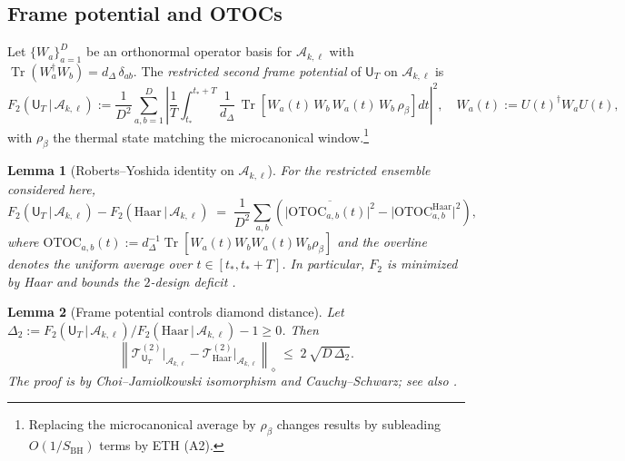 \documentclass[a4paper,11pt]{article}
\newcommand{\Tr}{\operatorname{Tr}}
\theoremstyle{plain}
\newtheorem{lemma}{Lemma}
\theoremstyle{definition}
\theoremstyle{remark}
\begin{document}
\subsection*{Frame potential and OTOCs}
Let $\{W_a\}_{a=1}^{D}$ be an orthonormal operator basis for $\mathscr{A}_{k,\ell}$ with $\Tr(W_a^\dagger W_b)=d_\Delta\,\delta_{ab}$.  The {\em restricted second frame potential} of $\mathsf{U}_T$ on $\mathscr{A}_{k,\ell}$ is
\begin{equation}
  F_2(\mathsf{U}_T \,|\, \mathscr{A}_{k,\ell}) := \frac{1}{D^2} \sum_{a,b=1}^{D}
   \left| \frac{1}{T}\int_{t_\ast}^{t_\ast+T} \frac{1}{d_\Delta}\, \Tr\!\left[ W_a(t) \, W_b \, W_a(t) \, W_b \, \rho_\beta \right] dt \right|^2,
   \quad W_a(t):=U(t)^\dagger W_a U(t),
\end{equation}
with $\rho_\beta$ the thermal state matching the microcanonical window.\footnote{Replacing the microcanonical average by $\rho_\beta$ changes results by subleading $O(1/S_{\mathrm{BH}})$ terms by ETH (A2).}

\begin{lemma}[Roberts--Yoshida identity on $\mathscr{A}_{k,\ell}$]\label{lem:RY}
For the restricted ensemble considered here,
\begin{equation}
  F_2(\mathsf{U}_T \,|\, \mathscr{A}_{k,\ell}) - F_2(\mathrm{Haar} \,|\, \mathscr{A}_{k,\ell})
  \;=\; \frac{1}{D^2}\sum_{a,b}\left( \overline{\big| \mathrm{OTOC}_{a,b}(t)\big|^2} - \big| \mathrm{OTOC}^{\mathrm{Haar}}_{a,b} \big|^2 \right),
\end{equation}
where $\mathrm{OTOC}_{a,b}(t):= d_\Delta^{-1}\Tr\!\left[ W_a(t) W_b W_a(t) W_b \rho_\beta \right]$ and the overline denotes the uniform average over $t\in[t_\ast,t_\ast+T]$.  In particular, $F_2$ is minimized by Haar and bounds the $2$-design deficit \cite{RobertsYoshida2017}.
\end{lemma}

\begin{lemma}[Frame potential controls diamond distance]\label{lem:FP-diamond}
Let $\Delta_2:=F_2(\mathsf{U}_T \,|\, \mathscr{A}_{k,\ell})/F_2(\mathrm{Haar} \,|\, \mathscr{A}_{k,\ell})-1\ge 0$.  Then
\begin{equation}
 \left\| \mathcal{T}^{(2)}_{\mathsf{U}_T}\big|_{\mathscr{A}_{k,\ell}} - \mathcal{T}^{(2)}_{\mathrm{Haar}}\big|_{\mathscr{A}_{k,\ell}} \right\|_{\diamond}
 \;\le\; 2\, \sqrt{ D \, \Delta_2 }.
\end{equation}
The proof is by Choi--Jamiolkowski isomorphism and Cauchy--Schwarz; see also \cite{RobertsYoshida2017,BrandaoHarrowHorodecki2016}.
\end{lemma}
\end{document}
